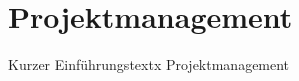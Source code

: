 \documentclass[main.tex]{subfiles} %
\begin{document}

\section{Projektmanagement}

Kurzer Einführungstextx Projektmanagement


\newpage


\newpage


\newpage
\end{document}
